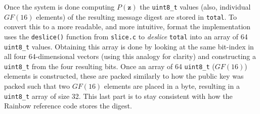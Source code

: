 Once the system is done computing $P(\textbf{z})$ the \texttt{uint8\_t} values (also, individual $GF(16)$ elements) of the resulting message digest are stored in \texttt{total}. To convert this to a more readable, and more intuitive, format the implementation uses the \texttt{deslice()} function from \texttt{slice.c} to \emph{deslice} \texttt{total} into an array of 64 \texttt{uint8\_t} values. Obtaining this array is done by looking at the same bit-index in all four 64-dimensional vectors (using this analogy for clarity) and constructing a \texttt{uint8\_t} from the four resulting bits. Once an array of 64 \texttt{uint8\_t} ($GF(16)$) elements is constructed, these are packed similarly to how the public key was packed such that two $GF(16)$ elements are placed in a byte, resulting in a \texttt{uint8\_t} array of size 32. This last part is to stay consistent with how the Rainbow reference code stores the digest.